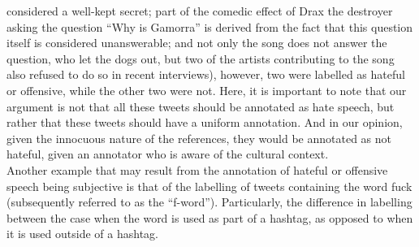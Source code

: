 \documentclass{letter}
\begin{document}
\newpage
\begin{multicols}{2}
considered a well-kept secret; part of the comedic effect 
of Drax the destroyer asking the question “Why is 
Gamorra” is derived from the fact that this question 
itself is considered unanswerable; and not only the song 
does not answer the question, who let the dogs out, but 
two of the artists contributing to the song also refused to 
do so in recent interviews), however, two were labelled 
as hateful or offensive, while the other two were not. 
Here, it is important to note that our argument is not 
that all these tweets should be annotated as hate speech, 
but rather that these tweets should have a uniform 
annotation. And in our opinion, given the innocuous 
nature of the references, they would be annotated as not 
hateful, given an annotator who is aware of the cultural 
context.\\
Another example that may result from the annotation 
of hateful or offensive speech being subjective is that of 
the labelling of tweets containing the word fuck 
(subsequently referred to as the “f-word”). Particularly, 
the difference in labelling between the case when the 
word is used as part of a hashtag, as opposed to when it 
is used outside of a hashtag. 


\end{multicols}
\end{document}

